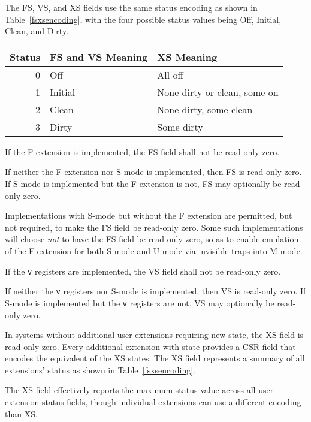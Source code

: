 The FS, VS, and XS fields use the same status encoding as shown in
Table~\ref{fsxsencoding}, with the four possible status values being
Off, Initial, Clean, and Dirty.

\begin{table*}[h!]
\begin{center}
\begin{tabular}{|r|l|l|}
\hline
Status  & FS and VS Meaning & XS Meaning\\
\hline
0 & Off     &  All off \\
1 & Initial &  None dirty or clean, some on\\
2 & Clean   &  None dirty, some clean \\
3 & Dirty   &  Some dirty \\
\hline
\end{tabular}
\end{center}
\caption{Encoding of FS[1:0], VS[1:0], and XS[1:0] status fields.}
\label{fsxsencoding}
\end{table*}

If the F extension is implemented, the FS field shall not be
read-only zero.

If neither the F extension nor S-mode is implemented, then FS is
read-only zero.
If S-mode is implemented but the F extension is not, FS may optionally
be read-only zero.

\begin{commentary}
Implementations with S-mode but without the F extension are
permitted, but not required, to make the FS field be read-only zero.
Some such implementations will choose {\em not} to have the FS
field be read-only zero, so as to enable emulation of the F extension for
both S-mode and U-mode via invisible traps into M-mode.
\end{commentary}

If the {\tt v} registers are implemented, the VS field shall not be
read-only zero.

If neither the {\tt v} registers nor S-mode is implemented, then VS
is read-only zero.
If S-mode is implemented but the {\tt v} registers are not, VS may
optionally be read-only zero.

In systems without additional user extensions requiring new state, the
XS field is read-only zero.  Every additional extension with state
provides a CSR field that encodes the equivalent of the XS states.
The XS field represents a summary of all
extensions' status as shown in Table~\ref{fsxsencoding}.

\begin{commentary}
The XS field effectively reports the maximum status value across all
user-extension status fields, though individual extensions can use a
different encoding than XS.
\end{commentary}

